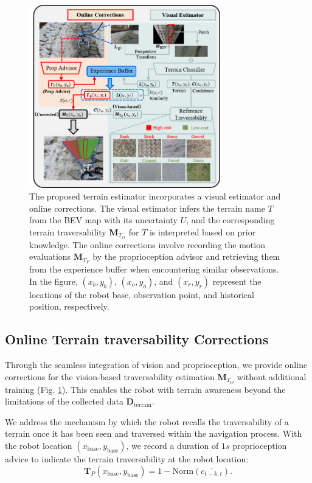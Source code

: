 \documentclass[conference]{IEEEtran}
\begin{document}
\begin{figure}[ht!bp]
\centerline{\includegraphics[width=8.3cm]{figures/Terrain_Estimator.pdf}}
\caption{ The proposed terrain estimator incorporates a visual estimator and online corrections. The visual estimator infers the terrain name $T$ from the BEV map with its uncertainty ${U}$, and the corresponding terrain traversability $\bm{M}_{T_O}$ for $T$ is interpreted based on prior knowledge. The online corrections involve recording the motion evaluations $\bm{M}_{T_P}$ by the proprioception advisor and retrieving them from the experience buffer when encountering similar observations. In the figure, $(x_b, y_b)$, $(x_o, y_o)$, and $(x_r, y_r)$ represent the locations of the robot base, observation point, and historical position, respectively.}
\label{terrainEst}
\end{figure}

\subsection{Online Terrain traversability Corrections}

{Through the seamless integration of vision and proprioception, we provide online corrections for the vision-based traversability estimation $\bm{M}_{T_O}$ without additional training (Fig. \ref{terrainEst})}. This enables the robot with terrain awareness beyond the limitations of the collected data $\bm{D}_\textrm{terrain}$.

We address the mechanism by which the robot recalls the traversability of a terrain once it has been seen and traversed within the navigation process. With the robot location $(x_\textrm{base},y_\textrm{base})$, we record a duration of $1s$ proprioception advice to indicate the terrain traversability at the robot location:
\begin{equation}
       \bm{T}_P(x_\textrm{base},y_\textrm{base})=1-\textrm{Norm}(\overline{c_{t-k:t}}).
\end{equation}
\end{document}
